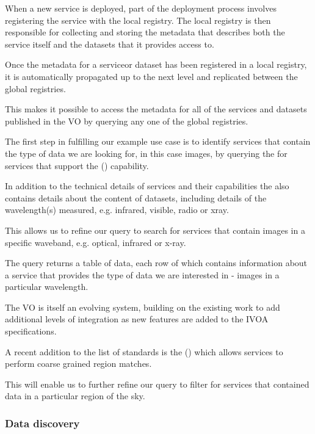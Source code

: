 \documentclass{article}
\begin{document}
When a new service is deployed, part of the deployment process involves
registering the service with the local registry. The local registry is then
responsible for collecting and storing the metadata that describes both the
service itself and the datasets that it provides access to.

Once the metadata for a serviceor dataset has been registered in a local registry,
it is automatically propagated up to the next level and replicated between the
global registries.

This makes it possible to access the metadata for all of the services and datasets
published in the VO by querying any one of the global registries.

The first step in fulfilling our example use case is to identify services that
contain the type of data we are looking for, in this case images, by querying
the \cite{ivoa.reg} for services that support the 
(\cite{ivoa.sia}) capability.

In addition to the technical details of services and their capabilities the
\cite{ivoa.reg} also contains details about the content of datasets, including
details of the wavelength(s) measured, e.g. infrared, visible, radio or xray.

This allows us to refine our query to search for \cite{ivoa.sia} services that
contain images in a specific waveband, e.g. optical, infrared or x-ray.

The \cite{ivoa.reg} query returns a table of data, each row of which contains
information about a \cite{ivoa.sia} service that provides the type of data we are
interested in - images in a particular wavelength.


The VO is itself an evolving system, building on the existing work to add
additional levels of integration as new features are added to the IVOA
specifications.

A recent addition to the list of \cite{ivoa} standards is the
 (\cite{ivoa.moc})
which allows \cite{ivoa.reg} services to perform coarse grained region matches.

This will enable us to further refine our \cite{ivoa.reg} query to filter for
\cite{ivoa.sia} services that contained data in a particular
region of the sky.

\subsubsection{Data discovery}
\end{document}
